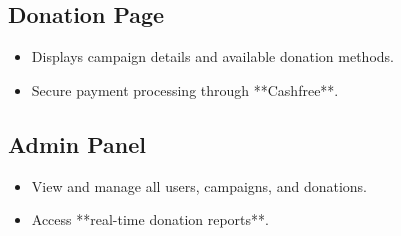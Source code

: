 \subsection{Donation Page}
\begin{itemize}
    \item Displays campaign details and available donation methods.
    \item Secure payment processing through **Cashfree**.
\end{itemize}

\subsection{Admin Panel}
\begin{itemize}
    \item View and manage all users, campaigns, and donations.
    \item Access **real-time donation reports**.
\end{itemize}
